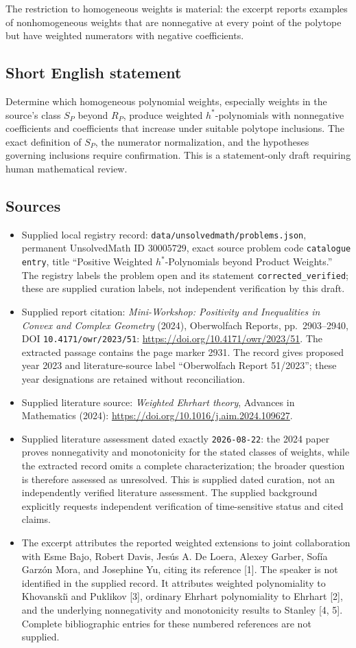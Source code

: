 \documentclass[11pt]{article}
\begin{document}
The restriction to homogeneous weights is material: the excerpt reports examples of nonhomogeneous weights that are nonnegative at every point of the polytope but have weighted numerators with negative coefficients.
\subsection{Short English statement}
Determine which homogeneous polynomial weights, especially weights in the source's class \(S_P\) beyond \(R_P\), produce weighted \(h^*\)-polynomials with nonnegative coefficients and coefficients that increase under suitable polytope inclusions. The exact definition of \(S_P\), the numerator normalization, and the hypotheses governing inclusions require confirmation. This is a statement-only draft requiring human mathematical review.
\subsection{Sources}
\begin{itemize}
\item Supplied local registry record: \texttt{data/unsolvedmath/problems.json}, permanent UnsolvedMath ID \(30005729\), exact source problem code \texttt{catalogue entry}, title ``Positive Weighted \(h^*\)-Polynomials beyond Product Weights.'' The registry labels the problem open and its statement \texttt{corrected\_verified}; these are supplied curation labels, not independent verification by this draft.
\item Supplied report citation: \emph{Mini-Workshop: Positivity and Inequalities in Convex and Complex Geometry} (2024), Oberwolfach Reports, pp.~2903--2940, DOI \texttt{10.4171/owr/2023/51}: \url{https://doi.org/10.4171/owr/2023/51}. The extracted passage contains the page marker 2931. The record gives proposed year 2023 and literature-source label ``Oberwolfach Report 51/2023''; these year designations are retained without reconciliation.
\item Supplied literature source: \emph{Weighted Ehrhart theory}, Advances in Mathematics (2024): \url{https://doi.org/10.1016/j.aim.2024.109627}.
\item Supplied literature assessment dated exactly \texttt{2026-08-22}: the 2024 paper proves nonnegativity and monotonicity for the stated classes of weights, while the extracted record omits a complete characterization; the broader question is therefore assessed as unresolved. This is supplied dated curation, not an independently verified literature assessment. The supplied background explicitly requests independent verification of time-sensitive status and cited claims.
\item The excerpt attributes the reported weighted extensions to joint collaboration with Esme Bajo, Robert Davis, Jes\'us A. De Loera, Alexey Garber, Sof\'ia Garz\'on Mora, and Josephine Yu, citing its reference [1]. The speaker is not identified in the supplied record. It attributes weighted polynomiality to Khovanski\u\i{} and Puklikov [3], ordinary Ehrhart polynomiality to Ehrhart [2], and the underlying nonnegativity and monotonicity results to Stanley [4, 5]. Complete bibliographic entries for these numbered references are not supplied.
\end{itemize}
\end{document}
